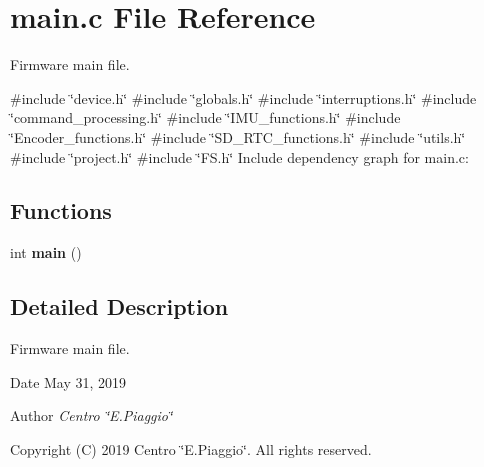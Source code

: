 \section{main.\+c File Reference}
\label{main_8c}


Firmware main file.  


{\ttfamily \#include \char`\"{}device.\+h\char`\"{}}\newline
{\ttfamily \#include \char`\"{}globals.\+h\char`\"{}}\newline
{\ttfamily \#include \char`\"{}interruptions.\+h\char`\"{}}\newline
{\ttfamily \#include \char`\"{}command\+\_\+processing.\+h\char`\"{}}\newline
{\ttfamily \#include \char`\"{}I\+M\+U\+\_\+functions.\+h\char`\"{}}\newline
{\ttfamily \#include \char`\"{}Encoder\+\_\+functions.\+h\char`\"{}}\newline
{\ttfamily \#include \char`\"{}S\+D\+\_\+\+R\+T\+C\+\_\+functions.\+h\char`\"{}}\newline
{\ttfamily \#include \char`\"{}utils.\+h\char`\"{}}\newline
{\ttfamily \#include \char`\"{}project.\+h\char`\"{}}\newline
{\ttfamily \#include \char`\"{}F\+S.\+h\char`\"{}}\newline
Include dependency graph for main.\+c\+:
\subsection*{Functions}
\begin{DoxyCompactItemize}
\item 
\mbox{\label{main_8c_ae66f6b31b5ad750f1fe042a706a4e3d4}} 
int {\bfseries main} ()
\end{DoxyCompactItemize}


\subsection{Detailed Description}
Firmware main file. 

\begin{DoxyDate}{Date}
May 31, 2019 
\end{DoxyDate}
\begin{DoxyAuthor}{Author}
{\itshape Centro \char`\"{}\+E.\+Piaggio\char`\"{}} 
\end{DoxyAuthor}
\begin{DoxyCopyright}{Copyright}
(C) 2019 Centro \char`\"{}\+E.\+Piaggio\char`\"{}. All rights reserved. 
\end{DoxyCopyright}

